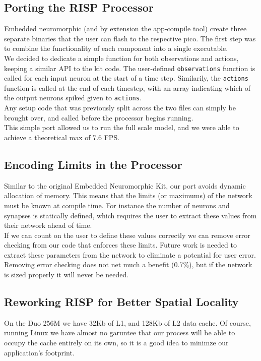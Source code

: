 \documentclass[conference]{IEEEtran}{}
\begin{document}
\subsection{Porting the RISP Processor}
\label{sec:org4a3642d}
Embedded neuromorphic (and by extension the app-compile tool) create three separate binaries that the user can flash to the respective pico. The first step was to combine the functionality of each component into a single executable.\\

We decided to dedicate a simple function for both observations and actions, keeping a similar API to the kit code. The user-defined \texttt{observations} function is called for each input neuron at the start of a time step. Similarily, the \texttt{actions} function is called at the end of each timestep, with an array indicating which of the output neurons spiked given to \texttt{actions}.\\

Any setup code that was previously split across the two files can simply be brought over, and called before the processor begins running.\\

This simple port allowed us to run the full scale model, and we were able to achieve a theoretical max of 7.6 FPS.\\
\subsection{Encoding Limits in the Processor}
\label{sec:org6f20aee}
Similar to the original Embedded Neuromorphic Kit, our port avoids dynamic allocation of memory. This means that the limits (or maximums) of the network must be known at compile time. For instance the number of neurons and synapses is statically defined, which requires the user to extract these values from their network ahead of time.\\

If we can count on the user to define these values correctly we can remove error checking from our code that enforces these limits. Future work is needed to extract these parameters from the network to eliminate a potential for user error.\\

Removing error checking does not net much a benefit (0.7\%), but if the network is sized properly it will never be needed.\\
\subsection{Reworking RISP for Better Spatial Locality}
\label{sec:org08b9a10}
On the Duo 256M we have 32Kb of L1, and 128Kb of L2 data cache. Of course, running Linux we have almost no garuntee that our process will be able to occupy the cache entirely on its own, so it is a good idea to minimze our application's footprint.\\
\end{document}
